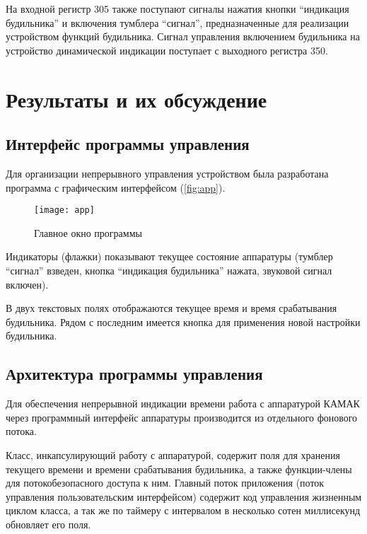 На входной регистр 305 также поступают сигналы нажатия кнопки \enquote{индикация будильника} и включения тумблера \enquote{сигнал}, предназначенные для реализации устройством функций будильника. Сигнал управления включением будильника на устройство динамической индикации поступает с выходного регистра 350.



\section{Результаты и их обсуждение}

\subsection{Интерфейс программы управления}

Для организации непрерывного управления устройством была разработана программа с графическим интерфейсом (\autoref{fig:app}).

\begin{figure}[h]%
\centering
\texttt{[image: app]}%
\caption[Главное окно программы.]{Главное окно программы}%
\label{fig:app}%
\end{figure}

Индикаторы (флажки) показывают текущее состояние аппаратуры (тумблер \enquote{сигнал} взведен, кнопка \enquote{индикация будильника} нажата, звуковой сигнал включен).

В двух текстовых полях отображаются текущее время и время срабатывания будильника. Рядом с последним имеется кнопка для применения новой настройки будильника.

\subsection{Архитектура программы управления}

Для обеспечения непрерывной индикации времени работа с аппаратурой КАМАК через программный интерфейс аппаратуры производится из отдельного фонового потока.

Класс, инкапсулирующий работу с аппаратурой, содержит поля для хранения текущего времени и времени срабатывания будильника, а также функции-члены для потокобезопасного доступа к ним. Главный поток приложения (поток управления пользовательским интерфейсом) содержит код управления жизненным циклом класса, а так же по таймеру с интервалом в несколько сотен миллисекунд обновляет его поля.

